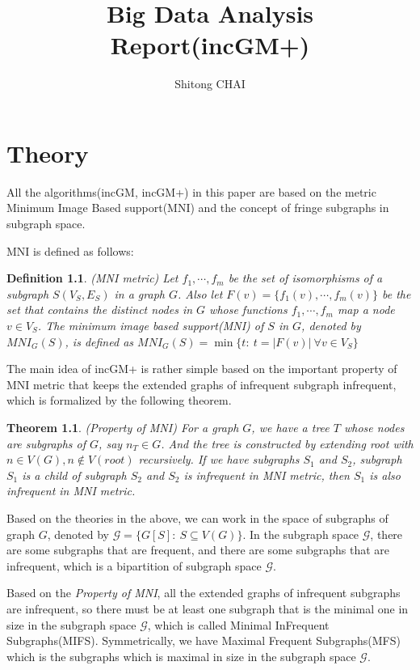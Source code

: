 \documentclass[a4paper, 12pt]{report}
\title{Big Data Analysis Report(incGM+)}
\date{}
\author{Shitong CHAI}
\newtheorem{theorem}{Theorem}[chapter]
\newtheorem{definition}{Definition}[chapter]
\newcounter{i}
\begin{document}
\maketitle
\tableofcontents

\chapter {Theory}
All the algorithms(incGM, incGM+) in this paper\cite{incGM} are based on the metric Minimum Image Based support(MNI)\cite{mni} and the concept of fringe subgraphs in subgraph space.

MNI is defined as follows:
\begin{definition}
    (MNI metric\cite{grami}) Let $f_1,\cdots,f_m$ be the set of isomorphisms of a subgraph $S(V_S,E_S)$ in a graph $G$. Also let $F(v)=\{f_1(v),\cdots,f_m(v)\}$ be the set that contains the distinct nodes in $G$ whose functions $f_1,\cdots,f_m$ map a node $v\in V_S$. The minimum image based support(MNI) of $S$ in $G$, denoted by $MNI_G(S)$, is defined as $MNI_G(S)=\min\{t:\ t=|F(v)|\ \forall v\in V_S\}$
\end{definition}

The main idea of incGM+ is rather simple based on the important property of MNI metric that keeps the extended graphs of infrequent subgraph infrequent, which is formalized by the following theorem.
\begin{theorem}
    (Property of MNI\cite{grami}) For a graph $G$, we have a tree $T$  whose nodes are subgraphs of $G$, say $n_T\in G$. And the tree is constructed by extending root with $n\in V(G), n\notin V(root)$ recursively. If we have subgraphs $S_1$ and $S_2$, subgraph $S_1$ is a child of subgraph $S_2$ and $S_2$ is infrequent in MNI metric, then $S_1$ is also infrequent in MNI metric.
\end{theorem}
Based on the theories in the above, we can work in the space of subgraphs of graph $G$, denoted by $\mathscr{G}=\{G[S]:\ S\subseteq V(G)\}$. In the subgraph space $\mathscr G$, there are some subgraphs that are frequent, and there are some subgraphs that are infrequent, which is a bipartition of subgraph space $\mathscr{G}$. 

Based on the \emph{Property of MNI}, all the extended graphs of infrequent subgraphs are infrequent, so there must be at least one subgraph that is the minimal one in size in the subgraph space $\mathscr{G}$, which is called Minimal InFrequent Subgraphs(MIFS). Symmetrically, we have
Maximal Frequent Subgraphs(MFS) which is the subgraphs which is maximal in size in the subgraph space $\mathscr{G}$.
\end{document}
